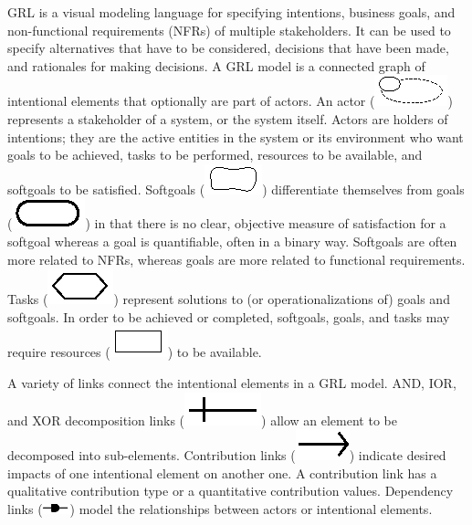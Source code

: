 \documentclass[11.5pt,two column]{llncs}
\begin{document}
GRL is a visual modeling language for specifying intentions, business goals, and non-functional requirements (NFRs) of multiple stakeholders. It can be used to specify alternatives that have to be considered, decisions that have been made, and rationales for making decisions. A GRL model is a connected graph of intentional elements that optionally are part of actors. An actor (\includegraphics[scale=1]{img/actor}) represents a stakeholder of a system, or the system itself. Actors are holders of intentions; they are the active entities in the system or its environment who want goals to be achieved, tasks to be performed, resources to be available, and softgoals to be satisfied. Softgoals (\includegraphics[scale=1]{img/softgoal}) differentiate themselves from goals (\includegraphics[scale=1]{img/goal}) in that there is no clear, objective measure of satisfaction for a softgoal whereas a goal is quantifiable, often in a binary way. Softgoals are often more related to NFRs, whereas goals are more related to functional requirements. Tasks (\includegraphics[scale=1]{img/task}) represent solutions to (or operationalizations of) goals and softgoals. In order to be achieved or completed, softgoals, goals, and tasks may require resources (\includegraphics[scale=1]{img/resource}) to be available.

A variety of links connect the intentional elements in a GRL model. AND, IOR, and XOR decomposition links (\includegraphics[scale=1]{img/decomposition}) allow an element to be decomposed into sub-elements. Contribution links (\includegraphics[scale=1]{img/contribution}) indicate desired impacts of one intentional element on another one. A contribution link has a qualitative contribution type or a quantitative contribution values. Dependency links (\includegraphics[scale=1]{img/dependency}) model the relationships between actors or intentional elements. 
\end{document}
